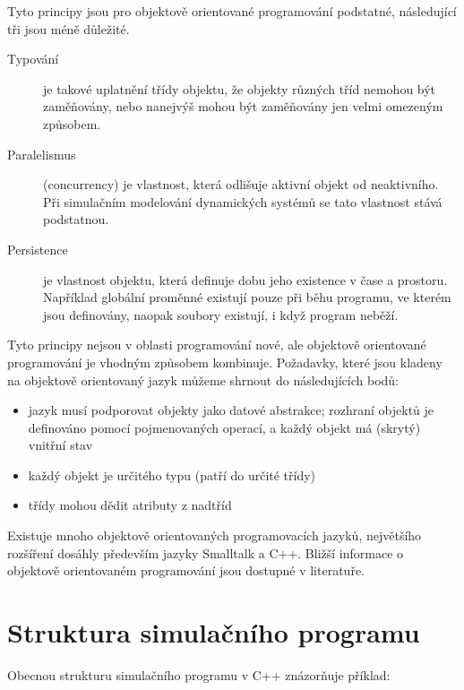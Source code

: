 \documentclass[a4paper]{article}
\begin{document}
Tyto principy jsou pro objektově orientované programování
podstatné, následující tři jsou méně důležité.

\begin{description}
\item[Typování]
 je takové uplatnění třídy objektu, že objekty různých
tříd nemohou být zaměňovány, nebo nanejvýš mohou být zaměňovány
jen velmi omezeným způsobem.

\item[Paralelismus] (concurrency)
 je vlastnost, která odlišuje aktivní objekt od
neaktivního. Při simulačním modelování dynamických systémů se
tato vlastnost stává podstatnou.

\item[Persistence]
 je vlastnost objektu, která definuje dobu jeho
existence v čase a prostoru. Například globální proměnné
existují pouze při běhu programu, ve kterém jsou definovány,
naopak soubory existují, i když program neběží.

\end{description}

Tyto principy nejsou v oblasti programování nové, ale objektově
orientované programování je vhodným způsobem kombinuje.
Požadavky, které jsou kladeny na objektově orientovaný jazyk můžeme shrnout do
následujících bodů:

\begin{itemize}
\item jazyk musí podporovat objekty jako datové abstrakce; rozhraní
   objektů je definováno pomocí pojmenovaných operací, a každý
   objekt má (skrytý) vnitřní stav

\item každý objekt je určitého typu (patří do určité třídy)

\item třídy mohou dědit atributy z nadtříd
\end{itemize}

Existuje mnoho objektově orientovaných programovacích jazyků,
největšího rozšíření dosáhly především jazyky Smalltalk a C++.
Bližší informace o objektově orientovaném programování jsou
dostupné v literatuře.



\section{Struktura simulačního programu}

Obecnou strukturu simulačního programu v C++ znázorňuje příklad:
\end{document}
